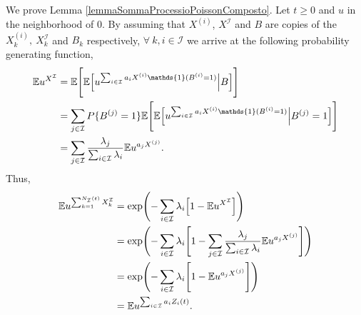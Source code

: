 \documentclass[12pt, twoside, english, headsepline]{article}
\theoremstyle{definition} %
\numberwithin{equation}{section} %
\begin{document}
We prove Lemma \ref{lemmaSommaProcessioPoissonComposto}. Let $t\ge0$ and $u$ in the neighborhood of $0$. By assuming that $X^{(i)}$, $X^\mathcal{I}$ and $B$ are copies of the $X_k^{(i)},\ X^\mathcal{I}_k$ and $B_k$ respectively, $\forall\ k, i\in\mathcal{I}$ we arrive at the following probability generating function,
\begin{align*}
\mathbb{E}u^{X^{\mathcal{I}}} &= \mathbb{E}\Biggl[\mathbb{E}\Bigl[ u^{\sum_{i\in\mathcal{I}} a_iX^{(i)}\mathds{1}(B^{(i)} =1)}\Big| B \Bigr]\Biggr]\\
& = \sum_{j\in\mathcal{I}} P\{B^{(j)} = 1\}\mathbb{E}\Biggl[\mathbb{E}\Bigl[ u^{\sum_{i\in\mathcal{I}} a_iX^{(i)}\mathds{1}(B^{(i)} =1)}\Big| B^{(j)} = 1 \Bigr]\Biggr] \\
& = \sum_{j\in\mathcal{I}} \frac{\lambda_j}{\sum_{i\in\mathcal{I}}\lambda_i} \mathbb{E}u^{a_jX^{(j)}}.
 \end{align*}
Thus, 
\begin{align*}
\mathbb{E}u^{\sum_{k=1}^{N_\mathcal{I}(t)} X^{\mathcal{I}}_k} & = \text{exp}\Biggl(-\sum_{i\in\mathcal{I}}\lambda_i\Bigl[ 1-\mathbb{E}u ^{X^\mathcal{I}}\Big]\Biggr)\\
& = \text{exp}\Biggl(-\sum_{i\in\mathcal{I}}\lambda_i\Biggl[ 1-\sum_{j\in\mathcal{I}} \frac{\lambda_j}{\sum_{i\in\mathcal{I}}\lambda_i} \mathbb{E}u^{a_jX^{(j)}}\Bigg]\Biggr)\\
& =  \text{exp}\Biggl(-\sum_{i\in\mathcal{I}}\lambda_i\Biggl[ 1- \mathbb{E}u^{a_jX^{(j)}}\Bigg]\Biggr)\\
& = \mathbb{E}u^{\sum_{i\in \mathcal{I}} a_iZ_i(t)}.
\end{align*}



\end{document}
